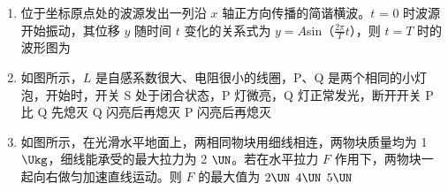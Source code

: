 \documentclass[\gkver]{gaokaozhenti}
\begin{document}
\begin{enumerate}
{C．根据电荷数和质量数守恒知，核反应方程为  +  $\to$  + 。故 C 不符合题意；

D．根据电荷数和质量数守恒知，核反应方程为  $\to$  + 。故 D 不符合题意。

故选 A。
}

\item
位于坐标原点处的波源发出一列沿 $x$ 轴正方向传播的简谐横波。$t$ = 0 时波源开始振动，其位移 $y$ 随时间 $t$ 变化的关系式为 $y = A$sin（$\frac{{2\pi }}{T} t$），则 $t = T$ 时的波形图为
\onepicture[w=16.62cm]{}

\item
如图所示，$L$ 是自感系数很大、电阻很小的线圈，P、Q 是两个相同的小灯泡，开始时，开关 S 处于闭合状态，P 灯微亮，Q 灯正常发光，断开开关
{P 比 Q 先熄灭}
{Q 闪亮后再熄灭}
{P 闪亮后再熄灭}

\item
如图所示，在光滑水平地面上，两相同物块用细线相连，两物块质量均为 1 $\Ukg$，细线能承受的最大拉力为 2 $\UN$。若在水平拉力 $F$ 作用下，两物块一起向右做匀加速直线运动。则 $F$ 的最大值为
\onepicture[w=3.26cm]{}
\fourchoices[answer=C]
{$1 \UN$}
{$2 \UN$}
{$4 \UN$}
{$5 \UN$}
\end{enumerate}
\end{document}
